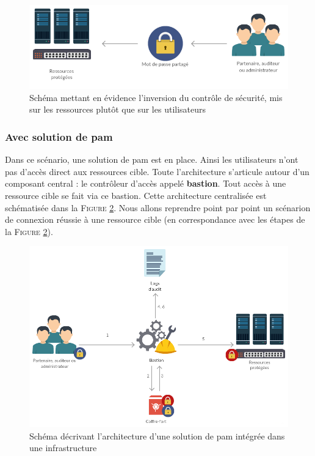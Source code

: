 \begin{figure}[!ht]
    \center
    \includegraphics[width=\textwidth]{./images/ressource_centered.png}
    \caption{Schéma mettant en évidence l'inversion du contrôle de sécurité, mis sur les ressources plutôt que sur les utilisateurs}
    \label{fig:invcont}
\end{figure}

\subsubsection{Avec solution de \gls{pam}}
\label{par:withpam}

Dans ce scénario, une solution de \gls{pam} est en place. Ainsi les utilisateurs n'ont pas d'accès direct aux ressources cible. Toute l'architecture s'articule autour d'un composant central : le contrôleur d'accès appelé \textbf{bastion}. Tout accès à une ressource cible se fait via ce bastion. Cette architecture centralisée est schématisée dans la \textsc{Figure} \ref{fig:schempam}. Nous allons reprendre point par point un scénarion de connexion réussie à une ressource cible (en correspondance avec les étapes de la \textsc{Figure} \ref{fig:schempam}).

\begin{figure}[!ht]
    \center
    \includegraphics[width=\textwidth]{./images/Schema_PAM.png}
    \caption{Schéma décrivant l'architecture d'une solution de \gls{pam} intégrée dans une infrastructure}
    \label{fig:schempam}
\end{figure}

